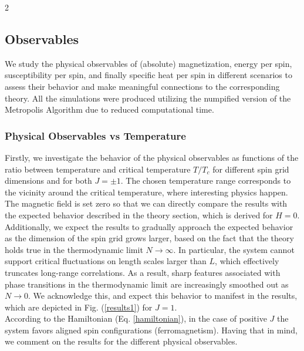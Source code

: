 \documentclass{article}
\begin{document}
\begin{multicols}{2}


\subsection{Observables}

We study the physical observables of (absolute) magnetization, energy per spin, susceptibility per spin, and finally specific heat per spin in different scenarios to assess their behavior and make meaningful connections to the corresponding theory. All the simulations were produced utilizing the numpified version of the Metropolis Algorithm due to reduced computational time.

\subsubsection{Physical Observables vs Temperature}

Firstly, we investigate the behavior of the physical observables as functions of the ratio between temperature and critical temperature $T/T_c$ for different spin grid dimensions and for both $J = \pm 1$. The chosen temperature range corresponds to the vicinity around the critical temperature, where interesting physics happen. The magnetic field is set zero so that we can directly compare the results with the expected behavior described in the theory section, which is derived for $H=0$.\\

Additionally, we expect the results to gradually approach the expected behavior as the dimension of the spin grid grows larger, based on the fact that the theory holds true in the thermodynamic limit $N \to \infty$. In particular, the system cannot support critical fluctuations on length scales larger than $L$, which effectively truncates long-range correlations. As a result, sharp features associated with phase transitions in the thermodynamic limit are increasingly smoothed out as $N \to 0$. We acknowledge this, and expect this behavior to manifest in the results, which are depicted in Fig. (\ref{results1}) for $J=1$.\\

According to the Hamiltonian (Eq. \eqref{hamiltonian}), in the case of positive $J$ the system favors aligned spin configurations (ferromagnetism). Having that in mind, we comment on the results for the different physical observables.\\


\end{multicols}
\end{document}
